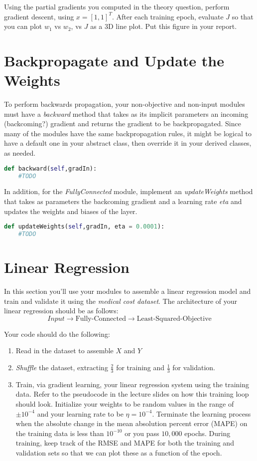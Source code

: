 \documentclass[12pt]{article}
\begin{document}
\noindent
Using the partial gradients you computed in the theory question, perform gradient descent, using $x=[1, 1]^T$.  After each training epoch, evaluate $J$ so that you can plot $w_1$ vs $w_2$, vs $J$ as a 3D line plot.  Put this figure in your report.

\section{Backpropagate and Update the Weights}
To perform backwards propagation, your non-objective and non-input modules must have a \emph{backward} method that takes as its implicit parameters an incoming (backcoming?) gradient and returns the gradient to be backpropagated.  Since many of the modules have the same backpropagation rules, it might be logical to have a default one in your abstract class, then override it in your derived classes, as needed.\\

\begin{lstlisting}[language=Python]
  def backward(self,gradIn):
    #TODO
\end{lstlisting}

\noindent
In addition, for the \emph{FullyConnected} module, implement an \emph{updateWeights} method that takes as parameters the backcoming gradient and a learning rate \emph{eta} and updates the weights and biases of the layer.

\begin{lstlisting}[language=Python]
  def updateWeights(self,gradIn, eta = 0.0001):
    #TODO
\end{lstlisting}

\newpage
\section{Linear Regression}
In this section you'll use your modules to assemble a linear regression model and train and validate it using the \emph{medical cost dataset}.  The architecture of your linear regression should be as follows:
$$Input \rightarrow  \textrm{Fully-Connected} \rightarrow \textrm{Least-Squared-Objective}$$

\noindent
Your code should do the following:
\begin{enumerate}
\item Read in the dataset to assemble $X$ and $Y$
\item \emph{Shuffle} the dataset, extracting $\frac{2}{3}$ for training and $\frac{1}{3}$ for validation.
\item Train, via gradient learning, your linear regression system using the training data.  Refer to the pseudocode in the lecture slides on how this training loop should look.  Initialize your weights to be random values in the range of $\pm 10^{-4}$ and your learning rate to be $\eta=10^{-4}$.  Terminate the learning process when the absolute change in the mean absolution percent error (MAPE) on the training data is less than $10^{-10}$ or you pass $10,000$ epochs.  During training, keep track of the RMSE and MAPE for both the training and validation sets so that we can plot these as a function of the epoch.
\end{enumerate}
\end{document}
